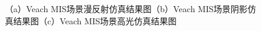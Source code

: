 \documentclass[10pt]{article}
\begin{document}
\begin{figure}[H]
\centering
{}
\quad
{}
\quad
{}
\caption{（a）Veach MIS场景漫反射仿真结果图（b）Veach MIS场景阴影仿真结果图（c）Veach MIS场景高光仿真结果图}
\end{figure}
\end{document}
